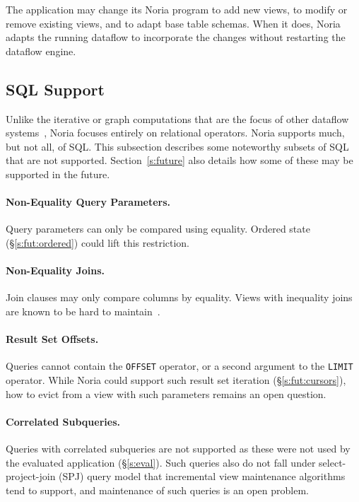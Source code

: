 The application may change its Noria program to add new views, to modify or
remove existing views, and to adapt base table schemas. When it does, Noria
adapts the running dataflow to incorporate the changes without restarting the
dataflow engine.

\subsection{SQL Support}

Unlike the iterative or graph computations that are the focus of other dataflow
systems~\cite{naiad, differential-dataflow}, Noria focuses entirely on
relational operators. Noria supports much, but not all, of SQL. This subsection
describes some noteworthy subsets of SQL that are not supported.
Section~\ref{s:future} also details how some of these may be supported in the
future.

\paragraph{Non-Equality Query Parameters.}
Query parameters can only be compared using equality. Ordered state
(\S\ref{s:fut:ordered}) could lift this restriction.

\paragraph{Non-Equality Joins.}
Join clauses may only compare columns by equality. Views with inequality joins
are known to be hard to maintain~\cite{inequality-incremental}.

\paragraph{Result Set Offsets.}
Queries cannot contain the \texttt{OFFSET} operator, or a second argument to the
\texttt{LIMIT} operator. While Noria could support such result set iteration
(\S\ref{s:fut:cursors}), how to evict from a view with such parameters remains
an open question.

\paragraph{Correlated Subqueries.}
Queries with correlated subqueries are not supported as these were not used by
the evaluated application (\S\ref{s:eval}). Such queries also do not fall under
select-project-join (SPJ) query model that incremental view maintenance
algorithms tend to support, and maintenance of such queries is an open problem.

